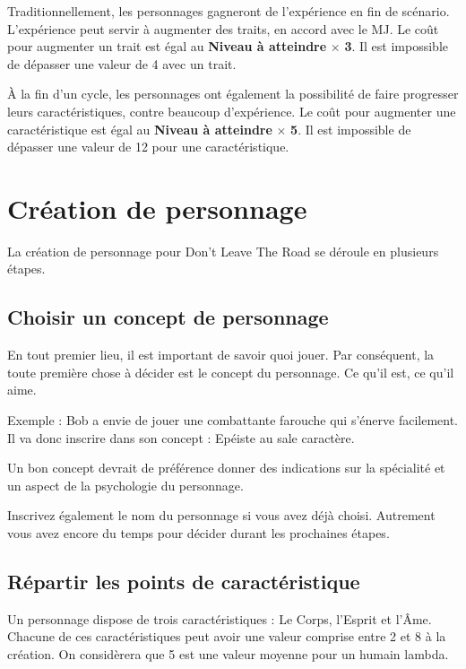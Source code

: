 \documentclass[a4paper,10pt,twoside,twocolumn,openany,bg=print]{dndbook}
\begin{document}
Traditionnellement, les personnages gagneront de l'expérience en fin de scénario. L'expérience peut servir à augmenter des traits, en accord avec le MJ. Le coût pour augmenter un trait est égal au \textbf{Niveau à atteindre} $\times$ \textbf{3}. Il est impossible de dépasser une valeur de 4 avec un trait.

À la fin d'un cycle, les personnages ont également la possibilité de faire progresser leurs caractéristiques, contre beaucoup d'expérience. Le coût pour augmenter une caractéristique est égal au \textbf{Niveau à atteindre} $\times$ \textbf{5}. Il est impossible de dépasser une valeur de 12 pour une caractéristique.

\chapter{Création de personnage}

La création de personnage pour Don't Leave The Road se déroule en plusieurs étapes.

\section{Choisir un concept de personnage}

En tout premier lieu, il est important de savoir quoi jouer. Par conséquent, la toute première chose à décider est le concept du personnage. Ce qu'il est, ce qu'il aime.

\begin{quotebox}
Exemple : Bob a envie de jouer une combattante farouche qui s'énerve facilement. Il va donc inscrire dans son concept : Epéiste au sale caractère.
\end{quotebox}

Un bon concept devrait de préférence donner des indications sur la spécialité et un aspect de la psychologie du personnage.

Inscrivez également le nom du personnage si vous avez déjà choisi. Autrement vous avez encore du temps pour décider durant les prochaines étapes.

\section{Répartir les points de caractéristique}

Un personnage dispose de trois caractéristiques : Le Corps, l'Esprit et l'Âme. Chacune de ces caractéristiques peut avoir une valeur comprise entre 2 et 8 à la création. On considèrera que 5 est une valeur moyenne pour un humain lambda.
\end{document}
